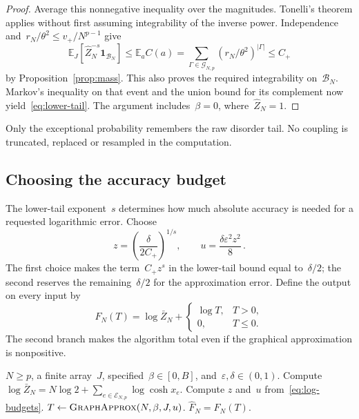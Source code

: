 \documentclass[10pt]{article}
\theoremstyle{plain}
\theoremstyle{definition}
\theoremstyle{remark}
\begin{document}
\begin{proof}
Average this nonnegative inequality over the magnitudes. Tonelli's theorem applies without first assuming integrability of the inverse power. Independence and~$r_N/\theta^2\le v_+/N^{p-1}$ give
\begin{equation*}
 \mathbb E_J[\hat Z_N^{-s}\mathbf1_{\mathcal B_N}]
 \le\mathbb E_a C(a)
 =\sum_{\Gamma\in\mathcal G_{N,p}}(r_N/\theta^2)^{|\Gamma|}
 \le C_+
\end{equation*}
by Proposition~\ref{prop:mass}. This also proves the required integrability on~$\mathcal B_N$. Markov's inequality on that event and the union bound for its complement now yield~\eqref{eq:lower-tail}. The argument includes~$\beta=0$, where~$\hat Z_N=1$.
\end{proof}
Only the exceptional probability remembers the raw disorder tail. No coupling is truncated, replaced or resampled in the computation.

\subsection{Choosing the accuracy budget}
The lower-tail exponent~$s$ determines how much absolute accuracy is needed for a requested logarithmic error. Choose
\begin{equation}\label{eq:log-budgets}
 z=\left(\frac{\delta}{2C_+}\right)^{1/s},\qquad
 u=\frac{\delta\varepsilon^2z^2}{8}\,.
\end{equation}
The first choice makes the term~$C_+z^s$ in the lower-tail bound equal to~$\delta/2$; the second reserves the remaining~$\delta/2$ for the approximation error. Define the output on every input by
\begin{equation}\label{eq:log-output}
 F_N(T)=\log\bar Z_N+
 \begin{cases}\log T,&T>0,\\0,&T\le0.\end{cases}
\end{equation}
The second branch makes the algorithm total even if the graphical approximation is nonpositive.

\begin{algorithm}[htbp]
\caption{Arbitrary-accuracy counting}\label{alg:counting}
\begin{algorithmic}[1]
\Require $N\ge p$, a finite array~$J$, specified~$\beta\in[0,B]$, and~$\varepsilon,\delta\in(0,1)$.
\State Compute $\log\bar Z_N=N\log2+\sum_{e\in\mathcal E_{N,p}}\log\cosh x_e$.
\State Compute $z$ and~$u$ from~\eqref{eq:log-budgets}.
\State $T\gets\textsc{GraphApprox}(N,\beta,J,u)$.
\State \Return $\widehat F_N=F_N(T)$.
\end{algorithmic}
\end{algorithm}
\end{document}
